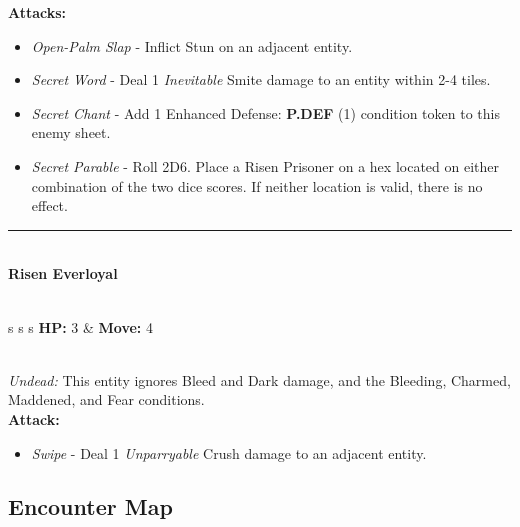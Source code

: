 \textbf{Attacks:}
\begin{itemize}
\item \emph{Open-Palm Slap} -  Inflict Stun on an adjacent entity.
\item \emph{Secret Word} - Deal 1 \emph{Inevitable} Smite damage to an entity within 2-4 tiles.
\item \emph{Secret Chant} - Add 1 Enhanced Defense: \textbf{P.DEF} (1) condition token to this enemy sheet.
\item \emph{Secret Parable} - Roll 2D6. Place a Risen Prisoner on a hex located on either combination of the two dice scores. If neither location is valid, there is no effect.
\end{itemize}
\hrule
\ \\
{\large \textbf{Risen Everloyal}}\\\\
\begin{tabular}{s s s}
\textbf{HP:} 3 & \textbf{Move:} 4\\
\end{tabular}\\

\emph{Undead:} This entity ignores Bleed and Dark damage, and the Bleeding, Charmed, Maddened, and Fear conditions.\\

\textbf{Attack:}
\begin{itemize}
\item \emph{Swipe} - Deal 1 \emph{Unparryable} Crush damage to an adjacent entity.
\end{itemize}

\pagebreak

\subsection*{Encounter Map}
\begin{center}
\end{center}

